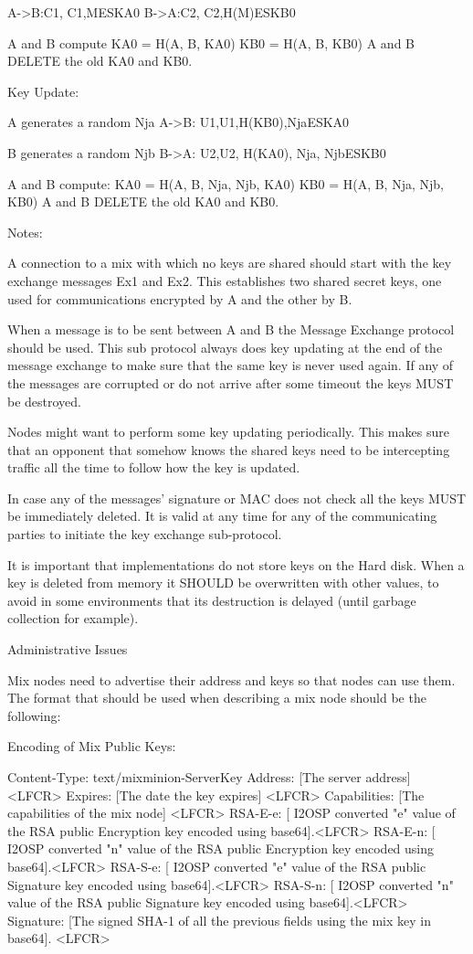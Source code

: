 A->B:C1, {C1,M}ESKA0
B->A:C2, {C2,H(M)}ESKB0

A and B compute
KA0 = H(A, B, KA0)
KB0 = H(A, B, KB0)
A and B DELETE the old KA0 and KB0.

Key Update:

A generates a random Nja
A->B: U1,{U1,H(KB0),Nja}ESKA0

B generates a random Njb
B->A: U2,{U2, H(KA0), Nja, Njb}ESKB0

A and B compute:
	KA0 = H(A, B, Nja, Njb, KA0)
      KB0 = H(A, B, Nja, Njb, KB0)
A and B DELETE the old KA0 and KB0.

Notes:

A connection to a mix with which no keys are shared should start 
with the key exchange messages Ex1 and Ex2. This establishes two 
shared secret keys, one used for communications encrypted by A 
and the other by B. 

When a message is to be sent between A and B the Message Exchange 
protocol should be used. This sub protocol always does key updating 
at the end of the message exchange to make sure that the same key is 
never used again. If any of the messages are corrupted or do not
arrive after some timeout the keys MUST be destroyed. 

Nodes might want to perform some key updating periodically. This 
makes sure that an opponent that somehow knows the shared keys 
need to be intercepting traffic all the time to follow how the 
key is updated.

In case any of the messages' signature or MAC does not check all 
the keys MUST be immediately deleted. It is valid at any 
time for any of the communicating parties to initiate the key 
exchange sub-protocol.

It is important that implementations do not store keys on the Hard 
disk. When a key is deleted from memory it SHOULD be overwritten 
with other values, to avoid in some environments that its destruction 
is delayed (until garbage collection for example).

Administrative Issues

Mix nodes need to advertise their address and keys so that nodes can
use them. The format that should be used when describing a mix node
should be the following:

Encoding of Mix Public Keys:

Content-Type: text/mixminion-ServerKey
Address: [The server address] <LFCR>
Expires: [The date the key expires] <LFCR>
Capabilities: [The capabilities of the mix node] <LFCR>
RSA-E-e: [ I2OSP converted "e" value of the RSA public Encryption 
           key encoded using base64].<LFCR>
RSA-E-n: [ I2OSP converted "n" value of the RSA public Encryption 
           key encoded using base64].<LFCR>
RSA-S-e: [ I2OSP converted "e" value of the RSA public Signature 
           key encoded using base64].<LFCR>
RSA-S-n: [ I2OSP converted "n" value of the RSA public Signature 
           key encoded using base64].<LFCR>
Signature: [The signed SHA-1 of all the previous fields using the 
            mix key in base64]. <LFCR>

